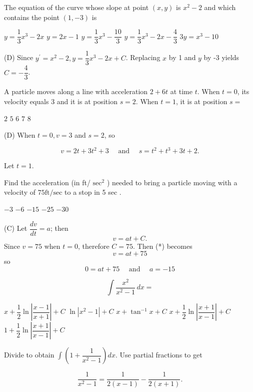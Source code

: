 \question
The equation of the curve whose slope at point $(x, y)$ is $x^{2}-2$ and which contains the point $(1,-3)$ is
\begin{choices}
  \choice $y=\dfrac{1}{3} x^{3}-2 x$
  \choice $y=2 x-1$
  \choice $y=\dfrac{1}{3} x^{3}-\dfrac{10}{3}$
  \CorrectChoice $y=\dfrac{1}{3} x^{3}-2 x-\dfrac{4}{3}$
  \choice $3 y=x^{3}-10$
\end{choices}
\begin{solution}
(D) Since $y^{\prime}=x^{2}-2, y=\dfrac{1}{3} x^{3}-2 x+C$. Replacing $x$ by 1 and $y$ by -3 yields $C=-\dfrac{4}{3}$.
\end{solution}


\newpage




\question
A particle moves along a line with acceleration $2+6 t$ at time $t$. When $t=0$, its velocity equals 3 and it is at position $s=2$. When $t=1$, it is at position $s=$
\begin{choices}
  \choice$2$
  \choice$5$
  \choice$6$
  \CorrectChoice$7$
  \choice$8$
\end{choices}
\begin{solution}
(D) When $t=0, v=3$ and $s=2$, so

\[
v=2 t+3 t^{2}+3 \quad \text { and } \quad s=t^{2}+t^{3}+3 t+2 .
\]

Let $t=1$.
\end{solution}

\question
Find the acceleration (in ft/ $\mathrm{sec}^{2}$ ) needed to bring a particle moving with a velocity of $75 \mathrm{ft} / \mathrm{sec}$ to a stop in 5 sec .
\begin{choices}
  \choice$-3$
  \choice$-6$
  \CorrectChoice$-15$
  \choice$-25$
  \choice$-30$
\end{choices}
\begin{solution}
(C) Let $\dfrac{d v}{d t}=a$; then
\begin{equation*}
v=a t+C . \tag{*}
\end{equation*}
Since $v=75$ when $t=0$, therefore $C=75$. Then (*) becomes
\[
v=a t+75
\]
so
\[
0=a t+75 \quad \text { and } \quad a=-15
\]
\end{solution}


\newpage




\question\label{calc05:bc-last}
\[
\displaystyle\int \dfrac{x^{2}}{x^{2}-1} \,dx=
\]
\begin{choices}
  \CorrectChoice $x+\dfrac{1}{2} \ln \left|\dfrac{x-1}{x+1}\right|+C$
  \choice $\ln \left|x^{2}-1\right|+C$
  \choice $x+\tan ^{-1} x+C$
  \choice $x+\dfrac{1}{2} \ln \left|\dfrac{x+1}{x-1}\right|+C$
  \choice $1+\dfrac{1}{2} \ln \left|\dfrac{x+1}{x-1}\right|+C$
\end{choices}
\begin{solution}
Divide to obtain $\displaystyle\int\left(1+\dfrac{1}{x^{2}-1}\right) d x$. Use partial fractions to get


\[
\dfrac{1}{x^{2}-1}=\dfrac{1}{2(x-1)}-\dfrac{1}{2(x+1)} .
\]
\end{solution}
